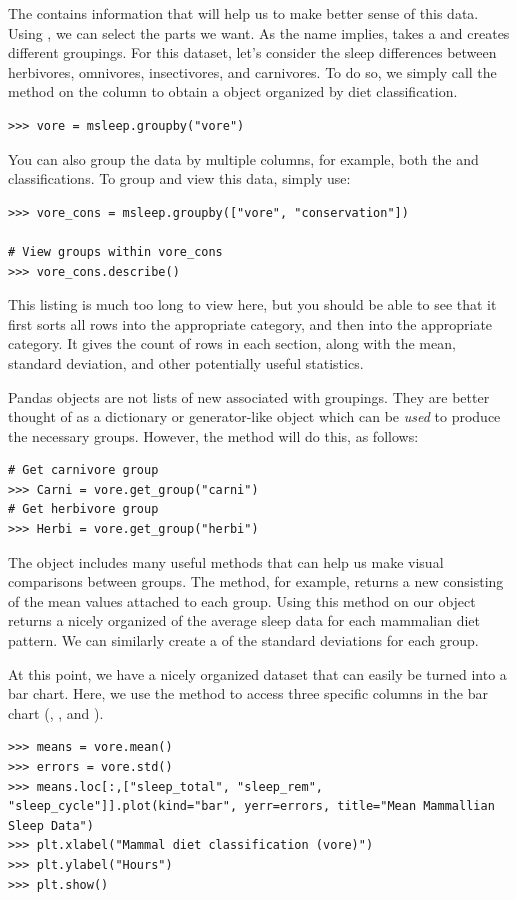 The  contains information that will help us to make better sense of this data.
Using , we can select the parts we want. As the name implies,  takes a  and creates different groupings. For this dataset, let's consider the sleep differences between herbivores, omnivores, insectivores, and carnivores. To do so, we simply call the  method on the  column to obtain a  object organized by diet classification.
\begin{lstlisting}
>>> vore = msleep.groupby("vore")
\end{lstlisting}
You can also group the data by multiple columns, for example, both the  and  classifications.
To group and view this data, simply use:
\begin{lstlisting}
>>> vore_cons = msleep.groupby(["vore", "conservation"])

# View groups within vore_cons
>>> vore_cons.describe()
\end{lstlisting}
This listing is much too long to view here, but you should be able to see that it first sorts all rows into the appropriate  category, and then into the appropriate  category.  It gives the count of rows in each section, along with the mean, standard deviation, and other potentially useful statistics.

Pandas  objects are not lists of new  associated with groupings.
They are better thought of as a dictionary or generator-like object which can be \emph{used} to produce the necessary groups.
However, the  method will do this, as follows:

\begin{lstlisting}
# Get carnivore group
>>> Carni = vore.get_group("carni")
# Get herbivore group
>>> Herbi = vore.get_group("herbi")
\end{lstlisting}

The  object includes many useful methods that can help us make visual comparisons between groups. 
The  method, for example, returns a new  consisting of the mean values attached to each group.
Using this method on our  object returns a nicely organized  of the average sleep data for each mammalian diet pattern.
We can similarly create a  of the standard deviations for each group.

At this point, we have a nicely organized dataset that can easily be turned into a bar chart.
Here, we use the  method to access three specific columns in the bar chart (, , and ).
\begin{lstlisting}
>>> means = vore.mean()
>>> errors = vore.std()
>>> means.loc[:,["sleep_total", "sleep_rem", "sleep_cycle"]].plot(kind="bar", yerr=errors, title="Mean Mammallian Sleep Data")
>>> plt.xlabel("Mammal diet classification (vore)")
>>> plt.ylabel("Hours")
>>> plt.show()
\end{lstlisting}


